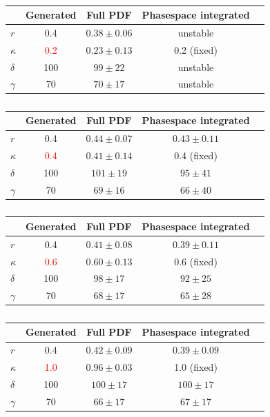 \clearpage	

\begin{table}[h]
	\caption{} 		
  \scriptsize
  \centering
  \begin{tabular}
    {l c c c c}
    \hline \hline
    & Generated &  Full PDF     &   Phasespace integrated  \\   \hline
	$r$ & 0.4 & $0.38 \pm 0.06$   &  unstable \\
	$\kappa$  & \textcolor{red}{0.2} & $0.23 \pm 0.13$ & 0.2 (fixed)  \\
	$\delta$ & 100 & $99 \pm 22$ &  unstable\\
	$\gamma$ & 70 & $70 \pm 17$  & unstable \\
    \hline \hline
  \end{tabular}

  \begin{tabular}
    {l c c c c}
    \hline \hline
    & Generated &  Full PDF    &   Phasespace integrated  \\   \hline
	$r$ & 0.4 & $0.44 \pm 0.07$      & $0.43 \pm 0.11$  \\
	$\kappa$  & \textcolor{red}{0.4} &$0.41 \pm 0.14$  & 0.4 (fixed)  \\
	$\delta$ & 100 & $101 \pm 19$  & $95 \pm 41$ \\
	$\gamma$ & 70 & $69 \pm 16$   & $66 \pm 40 $ \\
    \hline \hline
  \end{tabular}

  \begin{tabular}
    {l c c c c}
    \hline \hline
    & Generated &  Full PDF    &   Phasespace integrated  \\   \hline
	$r$ & 0.4 & $0.41 \pm 0.08$     & $0.39 \pm 0.11$  \\
	$\kappa$  & \textcolor{red}{0.6} & $0.60 \pm 0.13$  & 0.6 (fixed)  \\
	$\delta$ & 100 & $98 \pm 17$ & $92 \pm 25$ \\
	$\gamma$ & 70 & $68 \pm 17$ & $65 \pm 28$ \\
    \hline \hline
  \end{tabular}

  \begin{tabular}
    {l c c c c}
    \hline \hline
    & Generated &  Full PDF        &   Phasespace integrated  \\   \hline
	$r$ & 0.4 & $0.42 \pm 0.09$    &  $0.39 \pm 0.09$ \\
	$\kappa$  & \textcolor{red}{1.0} & $0.96 \pm 0.03$ &  1.0 (fixed)  \\
	$\delta$ & 100 & $100 \pm 17$ &  $100 \pm 17$  \\
	$\gamma$ & 70 & $66 \pm 17$ & $67 \pm 17$  \\
    \hline \hline
  \end{tabular}
\end{table}
